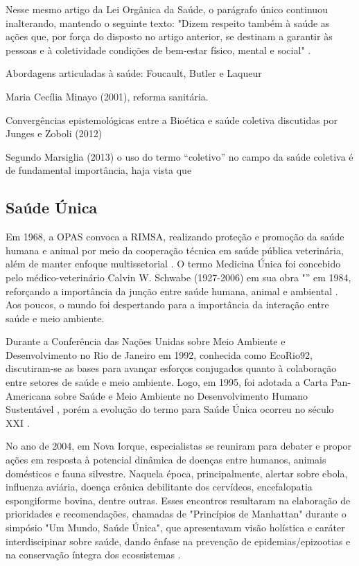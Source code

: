 \indent Nesse mesmo artigo da Lei Orgânica da Saúde, o parágrafo único continuou inalterando, mantendo o seguinte texto: "Dizem respeito também à saúde as ações que, por força do disposto no artigo anterior, se destinam a garantir às pessoas e à coletividade condições de bem-estar físico, mental e social" \cite{BRASIL1990LeiSUS}.


\indent Abordagens articuladas à saúde: Foucault, Butler e Laqueur

\indent Maria Cecília Minayo (2001), reforma sanitária.

\indent Convergências epistemológicas entre a Bioética e saúde coletiva discutidas por Junges
e Zoboli (2012)

\indent Segundo Marsiglia (2013) o uso do termo “coletivo” no campo da saúde coletiva é de
fundamental importância, haja vista que


\subsection{Saúde Única}

\indent Em 1968, a \acrfull{OPAS} convoca a \acrfull{RIMSA}, realizando proteção e promoção da saúde humana e animal por meio da cooperação técnica em saúde pública veterinária, além de manter enfoque multissetorial \cite{S1_OPAS_OMS}. O termo Medicina Única foi concebido pelo médico-veterinário Calvin W. Schwabe (1927-2006) em sua obra "” em 1984, reforçando a importância da junção entre saúde humana, animal e ambiental \cite{CFMVSaude}. Aos poucos, o mundo foi despertando para a importância da interação entre saúde e meio ambiente.

\indent Durante a Conferência das Nações Unidas sobre Meio Ambiente e Desenvolvimento no Rio de Janeiro em 1992, conhecida como EcoRio92, discutiram-se as bases para avançar esforços conjugados quanto à colaboração entre setores de saúde e meio ambiente. Logo, em 1995, foi adotada a Carta Pan-Americana sobre Saúde e Meio Ambiente no Desenvolvimento Humano Sustentável \cite{S1_OPAS_OMS}, porém a evolução do termo para Saúde Única ocorreu no século XXI \cite{CFMVSaude}. 

\indent No ano de 2004, em Nova Iorque, especialistas se reuniram para debater e propor ações em resposta à potencial dinâmica de doenças entre humanos, animais domésticos e fauna silvestre. Naquela época, principalmente, alertar sobre ebola, influenza aviária, doença crônica debilitante dos cervídeos, encefalopatia espongiforme bovina, dentre outras. Esses encontros resultaram na elaboração de prioridades e recomendações, chamadas de "Princípios de Manhattan" durante o simpósio "Um Mundo, Saúde Única", que apresentavam visão holística e caráter interdiscipinar sobre saúde, dando ênfase na prevenção de epidemias/epizootias e na conservação íntegra dos ecossistemas \cite{ManhattanPrinciples2004}.

